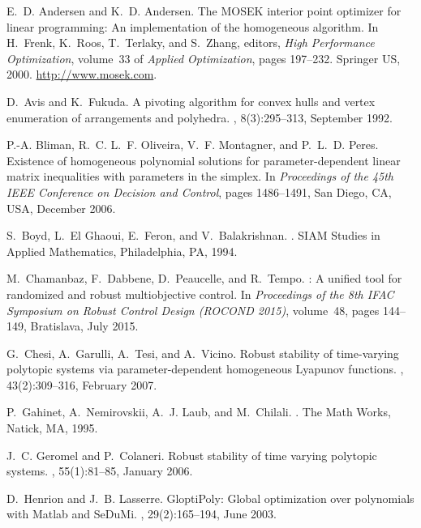 \documentclass[english,11pt]{article}
\theoremstyle{break} \theorembodyfont{\small\rm}
\begin{document}
\begin{thebibliography}{10}

E.~D. Andersen and K.~D. Andersen.
\newblock The {MOSEK} interior point optimizer for linear programming: An
  implementation of the homogeneous algorithm.
\newblock In H.~Frenk, K.~Roos, T.~Terlaky, and S.~Zhang, editors, {\em High
  Performance Optimization}, volume~33 of {\em Applied Optimization}, pages
  197--232. Springer US, 2000.
\newblock \url{http://www.mosek.com}.

D.~Avis and K.~Fukuda.
\newblock A pivoting algorithm for convex hulls and vertex enumeration of
  arrangements and polyhedra.
, 8(3):295--313, September
  1992.

P.-A. Bliman, R.~C. L.~F. Oliveira, V.~F. Montagner, and P.~L.~D. Peres.
\newblock Existence of homogeneous polynomial solutions for parameter-dependent
  linear matrix inequalities with parameters in the simplex.
\newblock In {\em Proceedings of the 45th IEEE Conference on Decision and
  Control}, pages 1486--1491, San Diego, CA, USA, December 2006.

S.~Boyd, L.~{El Ghaoui}, E.~Feron, and V.~Balakrishnan.
.
\newblock SIAM Studies in Applied Mathematics, Philadelphia, PA, 1994.

M.~Chamanbaz, F.~Dabbene, D.~Peaucelle, and R.~Tempo.
: {A} unified tool for randomized and robust
  multiobjective control.
\newblock In {\em Proceedings of the 8th IFAC Symposium on Robust Control
  Design (ROCOND 2015)}, volume~48, pages 144--149, Bratislava, July 2015.

G.~Chesi, A.~Garulli, A.~Tesi, and A.~Vicino.
\newblock Robust stability of time-varying polytopic systems via
  parameter-dependent homogeneous {L}yapunov functions.
, 43(2):309--316, February 2007.

P.~Gahinet, A.~Nemirovskii, A.~J. Laub, and M.~Chilali.
.
\newblock The Math Works, Natick, MA, 1995.

J.~C. Geromel and P.~Colaneri.
\newblock Robust stability of time varying polytopic systems.
, 55(1):81--85, January 2006.

D.~Henrion and J.~B. Lasserre.
\newblock Glopti{P}oly: {G}lobal optimization over polynomials with {M}atlab
  and {S}e{D}u{M}i.
, 29(2):165--194, June
  2003.


\end{thebibliography}
\end{document}
